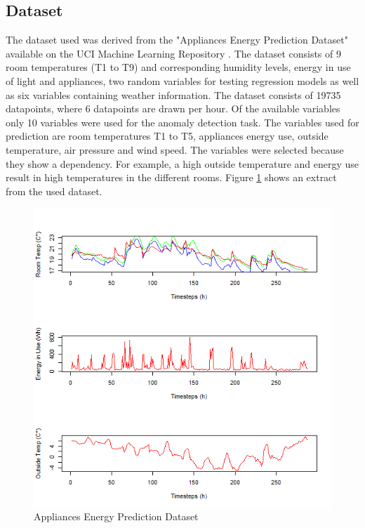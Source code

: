 \subsection{Dataset}
The dataset used was derived from the "Appliances Energy Prediction Dataset" available on the UCI Machine Learning Repository \parencite{Candanedo2015}. The dataset consists of 9 room temperatures (T1 to T9) and corresponding humidity levels, energy in use of light and appliances, two random variables for testing regression models as well as six variables containing weather information. The dataset consists of 19735 datapoints, where 6 datapoints are drawn per hour. Of the available variables only 10 variables were used for the anomaly detection task. The variables used for prediction are room temperatures T1 to T5, appliances energy use, outside temperature, air pressure and wind speed. The variables were selected because they show a dependency. For example, a high outside temperature and energy use result in high temperatures in the different rooms. Figure \ref{fig:temp_dataset} shows an extract from the used dataset.


\begin{figure}[h]
	\centering
	\includegraphics[scale=0.6]{Figures/temp_dataset}
	\decoRule
	\caption[Temperature Dataset]{Appliances Energy Prediction Dataset \parencite{Own}}
	\label{fig:temp_dataset}
\end{figure}

